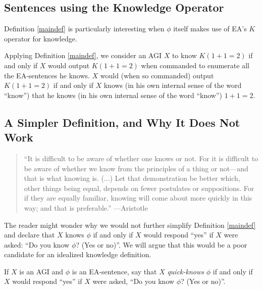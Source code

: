 \documentclass[runningheads]{llncs}
\begin{document}
\subsection{Sentences using the Knowledge Operator}

Definition \ref{maindef} is particularly interesting when $\phi$ itself
makes use of EA's $K$ operator for knowledge.

\begin{example}
Applying Definition \ref{maindef},
we consider an AGI $X$ to know $K(1+1=2)$ if and only if $X$ would output
$K(1+1=2)$ when commanded to enumerate all the EA-sentences he knows.
$X$ would (when so commanded)
output $K(1+1=2)$ if and only if $X$ knows (in his own internal sense of the word ``know'')
that he knows (in his own internal sense of the word ``know'') $1+1=2$.
\end{example}

\subsection{A Simpler Definition, and Why It Does Not Work}

\begin{quote}
  ``It is difficult to be aware of whether one knows or not.
  For it is difficult to be aware of whether we know from the
  principles of a thing or not---and that is what knowing is.
  (...)
  Let that demonstration be better which, other things
  being equal, depends on fewer postulates or suppositions.
  For if they are equally familiar, knowing will come about
  more quickly in this way; and that is preferable.''
  ---Aristotle \cite{aristotle}
\end{quote}

The reader might wonder why we would not further simplify Definition \ref{maindef}
and declare that $X$ knows $\phi$ if and only if $X$ would respond ``yes'' if
$X$ were asked: ``Do you know $\phi$? (Yes or no)''.
We will argue that this would be a poor candidate for an idealized knowledge
definition.

\begin{definition}
\label{instantlyknowsdefn}
  If $X$ is an AGI and $\phi$ is an EA-sentence, say that $X$ \emph{quick-knows}
  $\phi$ if and only if $X$ would respond ``yes'' if $X$ were asked,
  ``Do you know $\phi$? (Yes or no)''.
\end{definition}
\end{document}
